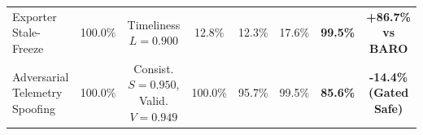 \begin{table}[t]
{\begin{tabular}{ll|ccc|ccc|ccc}
\hline
Exporter Stale-Freeze & 100.0\% & Timeliness $L=0.900$ & 12.8\% & 12.3\% & 17.6\% & \multicolumn{3}{c|}{\textbf{99.5\%}} & \multicolumn{2}{c}{\textbf{+86.7\% vs BARO}} \\
Adversarial Telemetry Spoofing & 100.0\% & Consist. $S=0.950$, Valid. $V=0.949$ & 100.0\% & 95.7\% & 99.5\% & \multicolumn{3}{c|}{\textbf{85.6\%}} & \multicolumn{2}{c}{\textbf{-14.4\% (Gated Safe)}} \\
\hline
\end{tabular}
}
\end{table}